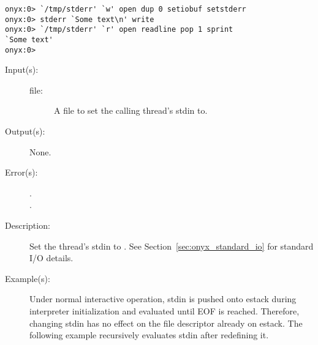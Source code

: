 \begin{description}
\begin{description}
\begin{verbatim}
onyx:0> `/tmp/stderr' `w' open dup 0 setiobuf setstderr
onyx:0> stderr `Some text\n' write
onyx:0> `/tmp/stderr' `r' open readline pop 1 sprint
`Some text'
onyx:0>
		\end{verbatim}
	\end{description}
\label{systemdict:setstdin}
\item[{\onyxop{file}{setstdin}{--}}: ]
	\begin{description}\item[]
	\item[Input(s): ]
		\begin{description}\item[]
		\item[file: ]
			A file to set the calling thread's stdin to.
		\end{description}
	\item[Output(s): ] None.
	\item[Error(s): ]
		\begin{description}\item[]
		\item[.]
		\item[.]
		\end{description}
	\item[Description: ]
		Set the thread's stdin to .  See
		Section~\ref{sec:onyx_standard_io} for standard I/O details.
	\item[Example(s): ]
		Under normal interactive operation, stdin is pushed onto estack
		during interpreter initialization and evaluated until EOF is
		reached.  Therefore, changing stdin has no effect on the file
		descriptor already on estack.  The following example recursively
		evaluates stdin after redefining it.
\begin{verbatim}


\end{verbatim}
\end{description}
\end{description}
